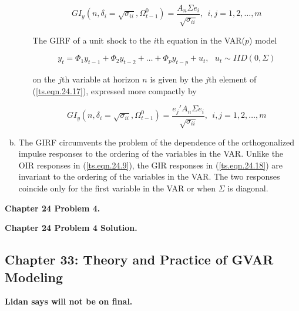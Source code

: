 \begin{enumerate}[(a)]
\begin{itemize}
\begin{equation}\label{ts.eqn.24.17}
GI_y(n, \delta_i  = \sqrt{\sigma_{ii}}, \Omega_{t-1}^0) = \frac{A_n \Sigma e_i}{\sqrt{\sigma_{ii}}}, \ \ i, j = 1, 2, \ldots, m
\end{equation}

The GIRF of a unit shock to the \(i\)th equation in the VAR(\(p\)) model 

\begin{equation}\label{ts.eqn.24.1}
y_t = \Phi_1 y_{t-1} + \Phi_2 y_{t-2} + \ldots + \Phi_p y_{t-p} + u_t, \ \ \ u_t \sim IID(0, \Sigma)
\end{equation}

on the \(j\)th variable at horizon \(n\) is given by the \(j\)th element of (\ref{ts.eqn.24.17}), expressed more compactly by

\begin{equation}\label{ts.eqn.24.18}
GI_y(n, \delta_i  = \sqrt{\sigma_{ii}}, \Omega_{t-1}^0) = \frac{e_j'A_n \Sigma e_i}{\sqrt{\sigma_{ii}}}, \ \ i, j = 1, 2, \ldots, m
\end{equation}

\end{itemize}

\item The GIRF circumvents the problem of the dependence of the orthogonalized impulse responses to the ordering of the variables in the VAR. Unlike the OIR responses in (\ref{ts.eqn.24.9}), the GIR responses in (\ref{ts.eqn.24.18}) are invariant to the ordering of the variables in the VAR. The two responses coincide only for the first variable in the VAR or when \(\Sigma\) is diagonal. 

\end{enumerate}



\textbf{Chapter 24 Problem 4.}



\textbf{Chapter 24 Problem 4 Solution.}

%
%
%
%
%
%

\subsection{Chapter 33: Theory and Practice of GVAR Modeling}

\textbf{Lidan says will not be on final.}



%
%
%
%
%
%

%